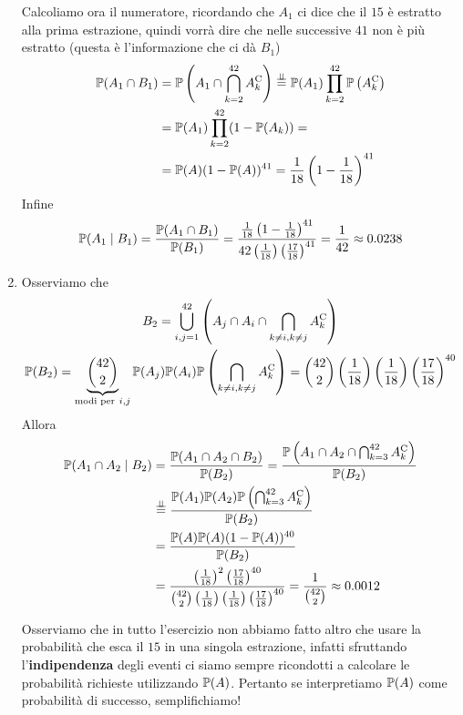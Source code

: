 \begin{enumerate}
	Calcoliamo ora il numeratore, ricordando che $A_{1}$ ci dice che il $15$ è estratto alla prima estrazione, quindi vorrà dire che nelle successive $41$ non è più estratto (questa è l'informazione che ci dà $B_{1}$)
	\begin{align*}
		\mathbb{P}(A_{1} \cap B_{1}) & =\mathbb{P}\left(A_{1} \cap \bigcap _{k=2}^{42} A_{k}^{\mathrm{C}}\right)\overset{\perp \!\!\! \perp }{=}\mathbb{P}(A_{1})\prod _{k=2}^{42}\mathbb{P}\left(A_{k}^{\mathrm{C}}\right)\\
		 & =\mathbb{P}(A_{1})\prod _{k=2}^{42}(1-\mathbb{P}(A_{k})) =\\
		 & =\mathbb{P}(A)(1-\mathbb{P}(A))^{41} =\frac{1}{18}\left(1-\frac{1}{18}\right)^{41}
	\end{align*}
	Infine
	\begin{equation*}
		\mathbb{P}(A_{1} \mid B_{1}) =\frac{\mathbb{P}(A_{1} \cap B_{1})}{\mathbb{P}(B_{1})} =\frac{\frac{1}{18}\left(1-\frac{1}{18}\right)^{41}}{42\left(\frac{1}{18}\right)\left(\frac{17}{18}\right)^{41}} =\frac{1}{42} \approx 0.0238
	\end{equation*}
	\item Osserviamo che
	\begin{gather*}
		B_{2} =\bigcup _{i,j=1}^{42}\left(A_{j} \cap A_{i} \cap \bigcap _{k\neq i,k\neq j} A_{k}\comp\right)\\
		\PP(B_{2}) =\underbrace{\binom{42}{2}}_{\text{modi per} \ i,j}\PP(A_{j})\PP(A_{i})\PP\left(\bigcap _{k\neq i,k\neq j} A_{k}\comp\right) =\binom{42}{2}\left(\frac{1}{18}\right)\left(\frac{1}{18}\right)\left(\frac{17}{18}\right)^{40}
	\end{gather*}
	Allora
	\begin{align*}
		\mathbb{P}(A_{1} \cap A_{2} \mid B_{2}) & =\frac{\mathbb{P}(A_{1} \cap A_{2} \cap B_{2})}{\mathbb{P}(B_{2})} =\frac{\mathbb{P}\left(A_{1} \cap A_{2} \cap \bigcap _{k=3}^{42} A_{k}^{\mathrm{C}}\right)}{\mathbb{P}(B_{2})}\\
		 & \overset{\perp \!\!\! \perp }{=}\frac{\mathbb{P}(A_{1})\mathbb{P}(A_{2})\mathbb{P}\left(\bigcap _{k=3}^{42} A_{k}^{\mathrm{C}}\right)}{\mathbb{P}(B_{2})}\\
		 & =\frac{\mathbb{P}(A)\mathbb{P}(A)(1-\mathbb{P}(A))^{40}}{\mathbb{P}(B_{2})}\\
		 & =\frac{\left(\frac{1}{18}\right)^{2}\left(\frac{17}{18}\right)^{40}}{\binom{42}{2}\left(\frac{1}{18}\right)\left(\frac{1}{18}\right)\left(\frac{17}{18}\right)^{40}} =\frac{1}{\binom{42}{2}} \approx 0.0012
	\end{align*}

	\begin{oss}
		Osserviamo che in tutto l'esercizio non abbiamo fatto altro che usare la probabilità che esca il $15$ in una singola estrazione, infatti sfruttando l'\textbf{indipendenza} degli eventi ci siamo sempre ricondotti a calcolare le probabilità richieste utilizzando $\mathbb{P}(A)$. Pertanto se interpretiamo $\mathbb{P}(A)$ come probabilità di successo, semplifichiamo!
	\end{oss}
\end{enumerate}

